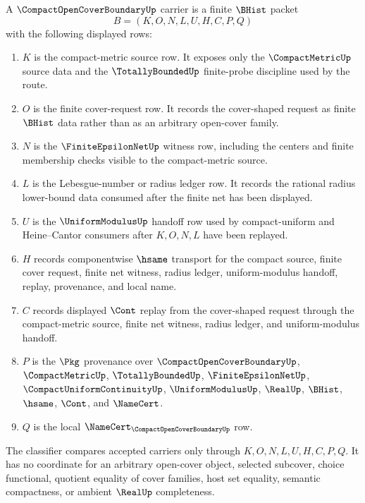 \begin{definition}
\label{def:compact-open-cover-boundary-carrier}
A $\CompactOpenCoverBoundaryUp$ carrier is a finite $\BHist$ packet
$$
B=(K,O,N,L,U,H,C,P,Q)
$$
with the following displayed rows:
\begin{enumerate}
\item $K$ is the compact-metric source row. It exposes only the
$\CompactMetricUp$ source data and the $\TotallyBoundedUp$ finite-probe
discipline used by the route.
\item $O$ is the finite cover-request row. It records the cover-shaped request
as finite $\BHist$ data rather than as an arbitrary open-cover family.
\item $N$ is the $\FiniteEpsilonNetUp$ witness row, including the centers and
finite membership checks visible to the compact-metric source.
\item $L$ is the Lebesgue-number or radius ledger row. It records the rational
radius lower-bound data consumed after the finite net has been displayed.
\item $U$ is the $\UniformModulusUp$ handoff row used by compact-uniform and
Heine--Cantor consumers after $K,O,N,L$ have been replayed.
\item $H$ records componentwise $\hsame$ transport for the compact source,
finite cover request, finite net witness, radius ledger, uniform-modulus
handoff, replay, provenance, and local name.
\item $C$ records displayed $\Cont$ replay from the cover-shaped request
through the compact-metric source, finite net witness, radius ledger, and
uniform-modulus handoff.
\item $P$ is the $\Pkg$ provenance over $\CompactOpenCoverBoundaryUp$,
$\CompactMetricUp$, $\TotallyBoundedUp$, $\FiniteEpsilonNetUp$,
$\CompactUniformContinuityUp$, $\UniformModulusUp$, $\RealUp$, $\BHist$,
$\hsame$, $\Cont$, and $\NameCert$.
\item $Q$ is the local $\NameCert_{\CompactOpenCoverBoundaryUp}$ row.
\end{enumerate}
The classifier compares accepted carriers only through $K,O,N,L,U,H,C,P,Q$.
It has no coordinate for an arbitrary open-cover object, selected subcover,
choice functional, quotient equality of cover families, host set equality,
semantic compactness, or ambient $\RealUp$ completeness.
\end{definition}
